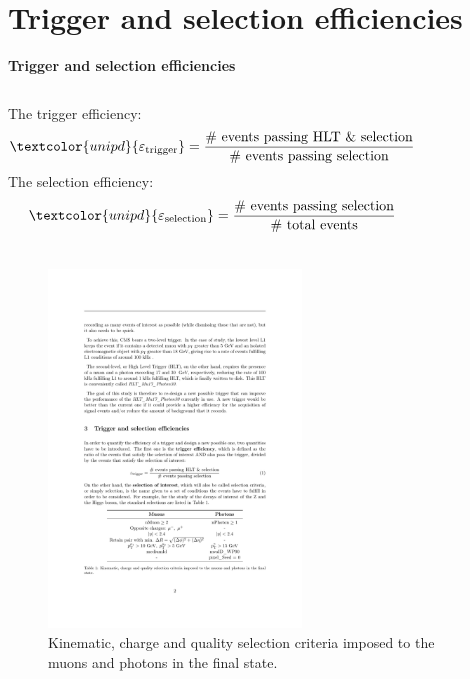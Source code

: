 \documentclass[aspectratio = 1610, xcolor = dvipsnames]{beamer}
\newcommand{\red}{\textcolor{unipd}}
\begin{document}
	\section{Trigger and selection efficiencies}
        \begin{frame}[t]{\bf Trigger and selection efficiencies}
            \vspace{0.3cm}
            \begin{columns}[c]
                The \red{trigger efficiency}:
                    \begin{equation*}
                        \red{\varepsilon_{\rm trigger}} = \frac{{\rm \#\ events\ passing\ HLT\ \& \ selection}}{{\rm \#\ events\ passing\ selection}}
                    \end{equation*}
                The \red{selection efficiency}:
                \begin{equation*}
                    \red{\varepsilon_{\rm selection}} = \frac{{\rm \#\ events\ passing\ selection}}{{\rm \#\ total\ events}}
                \end{equation*}
            \end{columns}
            \vspace{0.3cm}
            \begin{figure}[c]
                \centering
                \includegraphics[width=0.6\textwidth]{images/selection_table.pdf}
                \caption{Kinematic, charge and quality selection criteria imposed to the muons and photons in the final state.
                \label{im:selection_table}}
            \end{figure}
        \end{frame}
\end{document}

